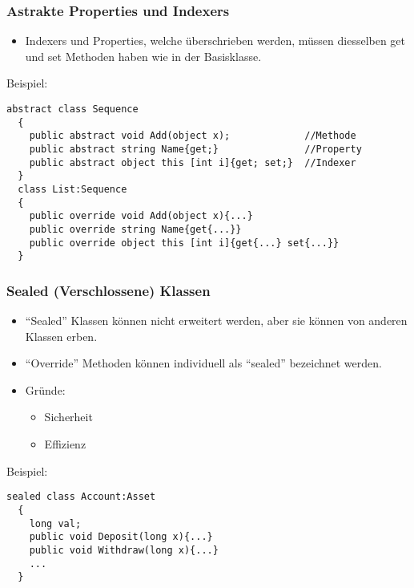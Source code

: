 \subsubsection{Astrakte Properties und Indexers}
\begin{itemize}
  \item Indexers und Properties, welche überschrieben werden, müssen diesselben
  get und set Methoden haben wie in der Basisklasse.
\end{itemize}
Beispiel: 
\begin{lstlisting}[style=Csharp]
  abstract class Sequence
  {
    public abstract void Add(object x);             //Methode
    public abstract string Name{get;}               //Property
    public abstract object this [int i]{get; set;}  //Indexer   
  }
  class List:Sequence
  {
    public override void Add(object x){...}
    public override string Name{get{...}}
    public override object this [int i]{get{...} set{...}}
  }
\end{lstlisting}

\newpage
\subsubsection{Sealed (Verschlossene) Klassen}
\begin{itemize}
  \item "`Sealed"' Klassen können nicht erweitert werden, aber sie können von
  anderen Klassen erben. 
  \item "`Override"' Methoden können individuell als "`sealed"' bezeichnet
  werden.
  \item Gründe:
  \begin{itemize}
    \item Sicherheit
    \item Effizienz
  \end{itemize}
\end{itemize}
Beispiel: 
\begin{lstlisting}[style=Csharp]
  sealed class Account:Asset
  {
    long val; 
    public void Deposit(long x){...}
    public void Withdraw(long x){...}
    ...
  }
\end{lstlisting}

